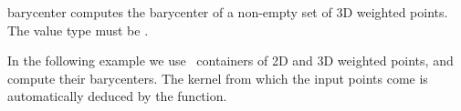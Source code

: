 \begin{ccRefFunction}{barycenter}
{ computes the barycenter of a non-empty set of 3D weighted points.
  The value type must be .
 }


\ccExample

In the following example we use \stl\ containers of 2D and 3D weighted points,
and compute their barycenters. The kernel from which the input points come is
automatically deduced by the function.


\ccSeeAlso
{}

\end{ccRefFunction}
